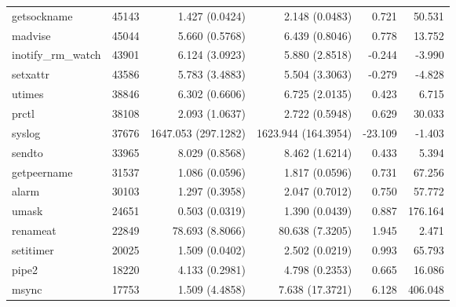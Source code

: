 \begin{longtable}{>{\ttfamily}lrrrrr}
                    getsockname &      45143 &              1.427 (0.0424) &            2.148 (0.0483) &           0.721 &       50.531 \\
                        madvise &      45044 &              5.660 (0.5768) &            6.439 (0.8046) &           0.778 &       13.752 \\
             inotify\_rm\_watch &      43901 &              6.124 (3.0923) &            5.880 (2.8518) &          -0.244 &       -3.990 \\
                       setxattr &      43586 &              5.783 (3.4883) &            5.504 (3.3063) &          -0.279 &       -4.828 \\
                         utimes &      38846 &              6.302 (0.6606) &            6.725 (2.0135) &           0.423 &        6.715 \\
                          prctl &      38108 &              2.093 (1.0637) &            2.722 (0.5948) &           0.629 &       30.033 \\
                         syslog &      37676 &         1647.053 (297.1282) &       1623.944 (164.3954) &         -23.109 &       -1.403 \\
                         sendto &      33965 &              8.029 (0.8568) &            8.462 (1.6214) &           0.433 &        5.394 \\
                    getpeername &      31537 &              1.086 (0.0596) &            1.817 (0.0596) &           0.731 &       67.256 \\
                          alarm &      30103 &              1.297 (0.3958) &            2.047 (0.7012) &           0.750 &       57.772 \\
                          umask &      24651 &              0.503 (0.0319) &            1.390 (0.0439) &           0.887 &      176.164 \\
                       renameat &      22849 &             78.693 (8.8066) &           80.638 (7.3205) &           1.945 &        2.471 \\
                      setitimer &      20025 &              1.509 (0.0402) &            2.502 (0.0219) &           0.993 &       65.793 \\
                          pipe2 &      18220 &              4.133 (0.2981) &            4.798 (0.2353) &           0.665 &       16.086 \\
                          msync &      17753 &              1.509 (4.4858) &           7.638 (17.3721) &           6.128 &      406.048 \\

\end{longtable}
